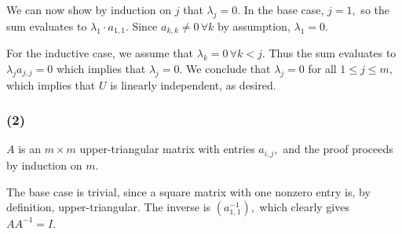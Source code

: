 \documentclass{article}
\begin{document}
We can now show by induction on $j$ that $\lambda_j = 0$.
In the base case, $j = 1,$ so the sum evaluates to $\lambda_1 \cdot a_{1,1}$.
Since $a_{k,k} \neq 0\, \forall k$ by assumption, $\lambda_1 = 0$.

For the inductive case, we assume that $\lambda_k = 0\, \forall k < j.$ Thus
the sum evaluates to $\lambda_j a_{j,j} = 0$ which implies that $\lambda_j=0$.
We conclude that $\lambda_j = 0$ for all $1 \leq j \leq m,$ which implies that
$U$ is linearly independent, as desired.

\subsubsection{(2)}
$A$ is an $m\times m$ upper-triangular matrix with entries $a_{i,j},$ and the proof proceeds
by induction on $m$.

The base case is trivial, since a square matrix with one nonzero entry is, by
definition, upper-triangular. The inverse is $(a_{1,1}^{-1}),$ which clearly
gives $AA^{-1} = I.$
\end{document}
